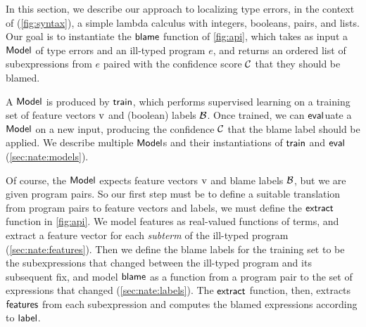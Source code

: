 \label{sec:nate:learning}
In this section, we describe our approach to localizing type errors, in the
context
of \lang (\autoref{fig:syntax}), a simple lambda calculus with integers,
booleans, pairs, and lists.
%
Our goal is to instantiate the $\mathsf{blame}$ function of
\autoref{fig:api}, which takes as input a $\mathsf{Model}$ of type errors and an
ill-typed program $e$, and returns an ordered list of subexpressions
from $e$ paired with the confidence score $\mathcal{C}$ that they should be
blamed.

A $\mathsf{Model}$ is produced by $\mathsf{train}$, which performs
supervised learning on a training set of feature vectors $\V$ and
(boolean) labels $\mathcal{B}$.
%
Once trained, we can $\mathsf{eval}$uate a $\mathsf{Model}$ on a new input,
producing the confidence $\mathcal{C}$ that the blame label should be
applied.
%
We describe multiple $\mathsf{Model}$s and their instantiations of
$\mathsf{train}$ and $\mathsf{eval}$
(\autoref{sec:nate:models}).

Of course, the $\mathsf{Model}$ expects feature vectors $\V$ and blame labels
$\mathcal{B}$, but we are given program pairs.
%
So our first step must be to define a suitable translation from program
pairs to feature vectors and labels, \ie we must define the
$\mathsf{extract}$ function in \autoref{fig:api}.
%
We model features as real-valued functions of
terms, and extract a feature vector for each \emph{subterm}
of the ill-typed program (\autoref{sec:nate:features}).
%
Then we define the blame labels for the training set to be the
subexpressions that changed between the ill-typed program and its
subsequent fix, and model $\mathsf{blame}$ as a function from a program pair
to the set of expressions that changed (\autoref{sec:nate:labels}).
%
The $\mathsf{extract}$ function, then, extracts $\mathsf{features}$ from each
subexpression and computes the blamed expressions according to
$\mathsf{label}$.




\label{sec:nate:features}




